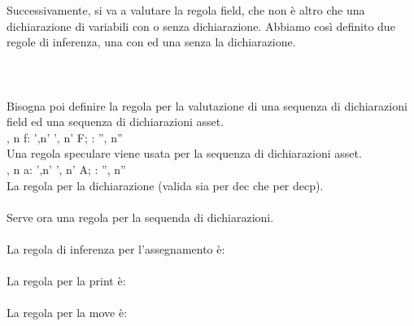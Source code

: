 \documentclass[12pt, a4paper]{report}
\begin{document}
Successivamente, si va a valutare la regola field, che non è altro che una dichiarazione di variabili con o senza dichiarazione. Abbiamo così definito due regole di inferenza, una con ed una senza la dichiarazione.
\\
\\
\\
\\
Bisogna poi definire la regola per la valutazione di una sequenza di dichiarazioni field ed una sequenza di dichiarazioni asset.\\ 
{\Gamma, n \vdash f: \Gamma',n' \; \Gamma', n' \vdash F; : \Gamma'', n'' }\\
Una regola speculare viene usata per la sequenza di dichiarazioni asset.\\
{\Gamma, n \vdash a: \Gamma',n' \;\;\;\;\;\; \Gamma', n' \vdash A; : \Gamma'', n'' }\\
La regola per la dichiarazione (valida sia per dec che per decp). \\
\\
Serve ora una regola per la sequenda di dichiarazioni.\\ 
\\
La regola di inferenza per l'assegnamento è: \\
\\
La regola per la print è:\\
\\
La regola per la move è:\\
\end{document}
